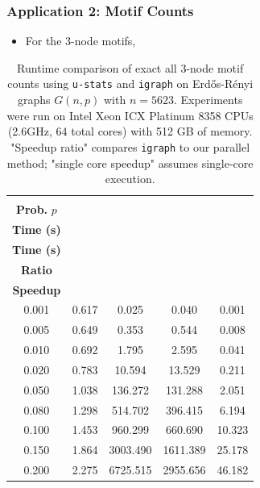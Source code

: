 \documentclass[9pt]{beamer}
\theoremstyle{mystyle}
\theoremstyle{mystyletwo}
\begin{document}
\begin{frame}
    \frametitle{Application 2: Motif Counts}
    \begin{itemize}
        \item For the 3-node motifs,
    \end{itemize}
    \begin{table}
        \centering
        \caption{
            Runtime comparison of exact all $3$-node motif counts using \texttt{u-stats} and \texttt{igraph} on Erdős-Rényi graphs $G(n, p)$ with $n = 5623$.
            Experiments were run on Intel Xeon ICX Platinum 8358 CPUs (2.6GHz, 64 total cores) with 512 GB of memory.
            "Speedup ratio" compares \texttt{igraph} to our parallel method; "single core speedup" assumes single-core execution.
        }
        \label{tab:motif_counts_3}
        \begin{tabular}{ccccc}
            \toprule
            \makecell{\textbf{Edge}                      \\ \textbf{Prob.} $p$} & \makecell{\textbf{\texttt{u-stats}} \\ \textbf{Time (s)}} & \makecell{\textbf{\texttt{igraph}} \\ \textbf{Time (s)}} &\makecell{\textbf{Speedup} \\ \textbf{Ratio}} &  \makecell{\textbf{Single-Core} \\ \textbf{Speedup}} \\
            \midrule
            0.001 & 0.617 & 0.025    & 0.040    & 0.001  \\
            0.005 & 0.649 & 0.353    & 0.544    & 0.008  \\
            0.010 & 0.692 & 1.795    & 2.595    & 0.041  \\
            0.020 & 0.783 & 10.594   & 13.529   & 0.211  \\
            0.050 & 1.038 & 136.272  & 131.288  & 2.051  \\
            0.080 & 1.298 & 514.702  & 396.415  & 6.194  \\
            0.100 & 1.453 & 960.299  & 660.690  & 10.323 \\
            0.150 & 1.864 & 3003.490 & 1611.389 & 25.178 \\
            0.200 & 2.275 & 6725.515 & 2955.656 & 46.182 \\
            \bottomrule
        \end{tabular}
    \end{table}
\end{frame}
\end{document}
